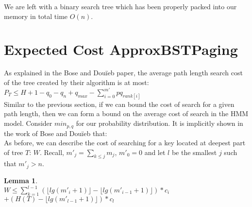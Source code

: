 \documentclass[letterpaper,12pt,titlepage,oneside,final]{book}
\theoremstyle{plain}
\newtheorem{lem}[thm]{Lemma}
\begin{document}
We are left with a binary search tree which has been properly packed into our memory in total time $O(n)$.


\section{Expected Cost ApproxBSTPaging}

As explained in the Bose and Dou\"{i}eb paper, the average path length search cost of the tree created by their algorithm is at most:\\ \cite{bose2009efficient}
$P_T \leq H + 1 - q_0 - q_n + q_{max} - \sum_{i=0}^{m'} pq_{rank[i]}$ \\

Similar to the previous section, if we can bound the cost of search for a given path length, then we can form a bound on the average cost of search in the HMM model. Consider $min_{p,q}$ for our probability distribution. It is implicitly shown in the work of Bose and Dou\"{i}eb that: \\

\iffalse
Using this, we can prove a more specific lemma about the height of our tree. 

\begin{lem}
 $H(T) \leq  depth(min_{p,q}) \leq \lfloor lg(\frac{1}{min_{p,q}}) \rfloor + 2$.
\end{lem}

\begin{proof}
I will simply give an outline here as the bulk of the proof follows from statements of Bose and Dou\"{i}eb, and is extremely similar to the ones presented in the previous sections. After \textbf{phase 1} of the algorithm, all "leaves" ($p's$ or $q's$ from our original data set) with probability $pq_i$ have depths of at most $\rfloor lg(\frac{1}{pq_i} \lfloor + 2$. After the final two phases of algorithm, at most one leaf has not moved up the tree. Thus, $depth(min_{p,q}) \leq lg(\frac{1}{min_{p,q}}) + 2$. Since $min_{p,q}$ is the smallest element in the distribution, this gives an upper bound on the height of the whole tree and the result follows.
\end{proof}

\fi


As before, we can describe the cost of searching for a key located at deepest part of tree $T$: $W$. Recall, $m'_j = \sum_{k \leq j} m_j$, $m'_0 = 0$ and let $l$ be the smallest $j$ such that $m'_j > n$.

\begin{lem} \hspace{1cm} \\
$W \leq \sum_{k=1}^{l-1} (\lfloor lg(m'_i+1) \rfloor - \lfloor lg(m'_{i-1}+1) \rfloor)*c_i$\\ $+ (H(T) - \lfloor lg(m'_{l-1}+1) \rfloor)*c_l$ 
\end{lem}
\end{document}
